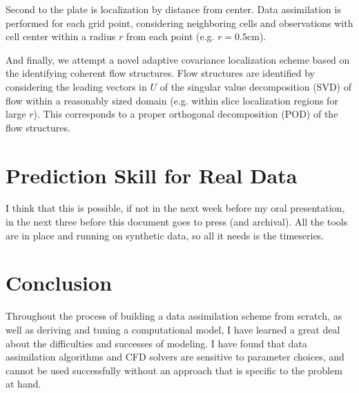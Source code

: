 Second to the plate is localization by distance from center.
Data assimilation is performed for each grid point, considering neighboring cells and observations with cell center within a radius $r$ from each point (e.g. $r = 0.5$cm).

And finally, we attempt a novel adaptive covariance localization scheme based on the identifying coherent flow structures.
Flow structures are identified by considering the leading vectors in $U$ of the singular value decomposition (SVD) of flow within a reasonably sized domain (e.g. within slice localization regions for large $r$).
This corresponds to a proper orthogonal decomposition (POD) of the flow structures.



\section{Prediction Skill for Real Data}

I think that this is possible, if not in the next week before my oral presentation, in the next three before this document goes to press (and archival).
All the tools are in place and running on synthetic data, so all it needs is the timeseries.

\section{Conclusion}

Throughout the process of building a data assimilation scheme from scratch, as well as deriving and tuning a computational model, I have learned a great deal about the difficulties and successes of modeling.
I have found that data assimilation algorithms and CFD solvers are sensitive to parameter choices, and cannot be used successfully without an approach that is specific to the problem at hand.


